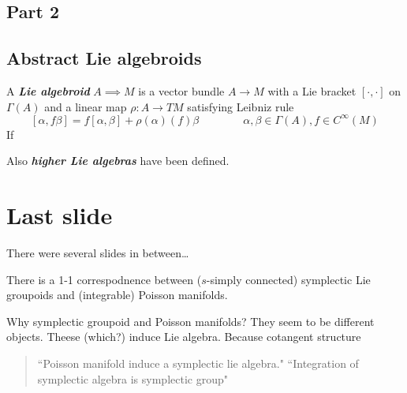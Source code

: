 \subsection{Part 2}

\subsection{Abstract Lie algebroids}

\begin{defn}\leavevmode
	A \textit{\textbf{Lie algebroid}} \(A \implies  M\) is a vector bundle \(A \to M\) with a Lie bracket \([\cdot,\cdot]\) on \(\Gamma(A)\) and a linear map \(\rho:A \to TM\) satisfying Leibniz rule
	\[[\alpha,f \beta]=f[\alpha,\beta]+\rho(\alpha)(f)\beta\qquad \qquad \alpha, \beta \in \Gamma(A),f \in C^\infty(M)\]
If 	
\end{defn}

\begin{remark}\leavevmode
Also \textit{\textbf{higher Lie algebras}} have been defined.
\end{remark}

\section{Last slide}
There were several slides in between…

\begin{thm}\leavevmode
There is a 1-1 correspodnence between (\(s\)-simply connected) symplectic Lie groupoids and (integrable) Poisson manifolds.
\end{thm}

Why symplectic groupoid and Poisson manifolds? They seem to be different objects. Theese (which?) induce Lie algebra. Because cotangent structure 

\begin{quotation}
``Poisson manifold induce a symplectic lie algebra." ``Integration of symplectic algebra is symplectic group"
\end{quotation}



